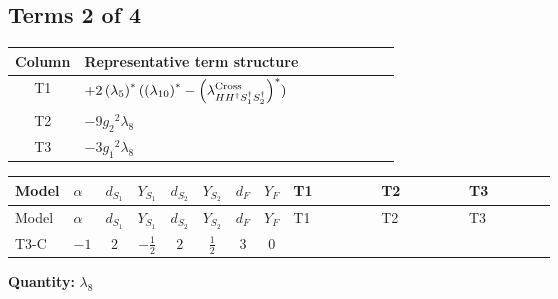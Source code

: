 \documentclass[8pt]{article}
\begin{document}
\begin{landscape}
\subsection*{Terms 2 of 4}
\begin{center}
\begin{tabular}{@{}c >{\raggedright\arraybackslash}p{0.82\linewidth}@{}}
\toprule
Column & Representative term structure \\
\midrule
T1 & \(\displaystyle +2 \left({\lambda_5}\right)^{*} (\left({\lambda_{10}}\right)^{*}-\left({\lambda_{H H^\dagger S_1^\dagger S_2^\dagger}^{\rm Cross}}\right)^{*})\) \\
\midrule
T2 & \(\displaystyle -9 {g_2}^2 {\lambda_{8}}\) \\
\midrule
T3 & \(\displaystyle -3 {g_1}^2 {\lambda_{8}}\) \\
\midrule
\bottomrule
\end{tabular}
\end{center}
\smallskip
\tiny
\begin{longtable}{@{}llcccccc >{\raggedright\arraybackslash}p{0.21\linewidth} >{\raggedright\arraybackslash}p{0.21\linewidth} >{\raggedright\arraybackslash}p{0.21\linewidth}@{}}
\toprule
Model & $\alpha$ & $d_{S_1}$ & $Y_{S_1}$ & $d_{S_2}$ & $Y_{S_2}$ & $d_F$ & $Y_F$ & T1 & T2 & T3 \\
\midrule
\endfirsthead
\toprule
Model & $\alpha$ & $d_{S_1}$ & $Y_{S_1}$ & $d_{S_2}$ & $Y_{S_2}$ & $d_F$ & $Y_F$ & T1 & T2 & T3 \\
\midrule
\endhead
T3-C & $-1$ & $2$ & $-\frac{1}{2}$ & $2$ & $\frac{1}{2}$ & $3$ & $0$ & \scriptsize\adjustbox{max width=\linewidth}{$\begin{gathered} +2 \left({\lambda_5}\right)^{*} (\left({\lambda_{10}}\right)^{*}-\left({\lambda_{H H^\dagger S_1^\dagger S_2^\dagger}^{\rm Cross}}\right)^{*})\end{gathered}$} & \scriptsize\adjustbox{max width=\linewidth}{$\begin{gathered} -9 {g_2}^2 {\lambda_{8}}\end{gathered}$} & \scriptsize\adjustbox{max width=\linewidth}{$\begin{gathered} -3 {g_1}^2 {\lambda_{8}}\end{gathered}$} \\
\midrule
\bottomrule
\end{longtable}
\clearpage
\noindent\textbf{Quantity: }$\lambda_{8}$\par\smallskip

\end{landscape}
\end{document}
